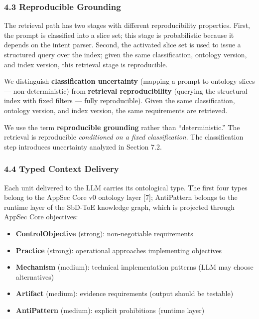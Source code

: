 \documentclass[
]{article}
\providecommand{\tightlist}{%
  \setlength{\itemsep}{0pt}\setlength{\parskip}{0pt}}
\begin{document}
\subsubsection{4.3 Reproducible Grounding}\label{reproducible-grounding}

The retrieval path has two stages with different reproducibility
properties. First, the prompt is classified into a slice set; this stage
is probabilistic because it depends on the intent parser. Second, the
activated slice set is used to issue a structured query over the index;
given the same classification, ontology version, and index version, this
retrieval stage is reproducible.

We distinguish \textbf{classification uncertainty} (mapping a prompt to
ontology slices --- non-deterministic) from \textbf{retrieval
reproducibility} (querying the structural index with fixed filters ---
fully reproducible). Given the same classification, ontology version,
and index version, the same requirements are retrieved.

We use the term \textbf{reproducible grounding} rather than
``deterministic.'' The retrieval is reproducible \emph{conditioned on a
fixed classification}. The classification step introduces uncertainty
analyzed in Section 7.2.

\subsubsection{4.4 Typed Context Delivery}\label{typed-context-delivery}

Each unit delivered to the LLM carries its ontological type. The first
four types belong to the AppSec Core v0 ontology layer {[}7{]};
AntiPattern belongs to the runtime layer of the SbD-ToE knowledge graph,
which is projected through AppSec Core objectives:

\begin{itemize}
\tightlist
\item
  \textbf{ControlObjective} (strong): non-negotiable requirements
\item
  \textbf{Practice} (strong): operational approaches implementing
  objectives
\item
  \textbf{Mechanism} (medium): technical implementation patterns (LLM
  may choose alternatives)
\item
  \textbf{Artifact} (medium): evidence requirements (output should be
  testable)
\item
  \textbf{AntiPattern} (medium): explicit prohibitions (runtime layer)
\end{itemize}
\end{document}
